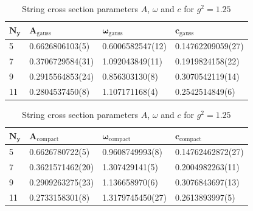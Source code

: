 \begin{table}[!hb]
\centering
\begin{tabular}{llll}
    $\mathbf{N_y}$ & $\mathbf{A_\mathrm{gauss}}$ & $\mathbf{\omega_\mathrm{gauss}}$ & $\mathbf{c_\mathrm{gauss}}$ \\ \hline
   5 & 0.6626806103(5) & 0.6006582547(12) & 0.14762209059(27) \\
   7 & 0.3706729584(31) & 1.092043849(11) & 0.1919824158(22) \\
   9 & 0.2915564853(24) & 0.856303130(8) & 0.3070542119(14) \\
   11 & 0.2804537450(8) & 1.107171168(4) & 0.2542514849(6) \\
\end{tabular}
\begin{tabular}{llll}
    $\mathbf{N_y}$ & $\mathbf{A_\mathrm{compact}}$ & $\mathbf{\omega_\mathrm{compact}}$ & $\mathbf{c_\mathrm{compact}}$ \\ \hline
   5 & 0.6626780722(5) & 0.9608749993(8) & 0.14762462872(27) \\
   7 & 0.3621571462(20) & 1.307429141(5) & 0.2004982263(11) \\
   9 & 0.2909263275(23) & 1.136658970(6) & 0.3076843697(13) \\
   11 & 0.2733158301(8) & 1.3179745450(27) & 0.2613893997(5) \\
\end{tabular}
\caption{String cross section parameters $A$, $\omega$ and $c$ for $g^2=1.25$}
\end{table}
